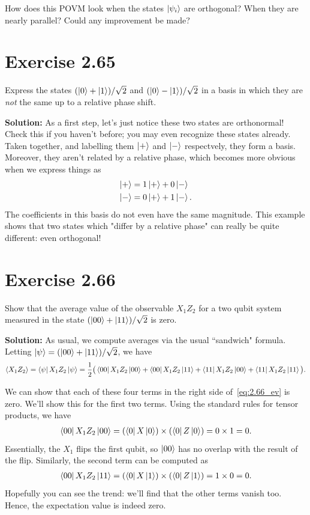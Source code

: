 \documentclass{book}
\begin{document}
    How does this POVM look when the states $\ket{\psi_i}$ are orthogonal? When they are nearly parallel? Could any improvement be made?

\section*{Exercise 2.65}
    Express the states $(\ket{0}+\ket{1})/\sqrt{2}$ and $(\ket{0}-\ket{1})/\sqrt{2}$ in a basis in which they are \emph{not} the same up to a relative phase shift.

    \textbf{Solution:} As a first step, let's just notice these two states are orthonormal! Check this if you haven't before; you may even recognize these states already. Taken together, and labelling them $\ket{+}$ and $\ket{-}$ respectvely, they form a basis. Moreover, they aren't related by a relative phase, which becomes more obvious when we express things as 
    \begin{align}
    \begin{aligned}
        \ket{+} &= 1\ket{+} + 0 \ket{-} \\
        \ket{-} &= 0\ket{+} + 1\ket{-}.
    \end{aligned}
    \end{align}
    The coefficients in this basis do not even have the same magnitude. This example shows that two states which "differ by a relative phase" can really be quite different: even orthogonal!

\section*{Exercise 2.66} 
    Show that the average value of the observable $X_1 Z_2$ for a two qubit system measured in the state $(\ket{00}+\ket{11})/\sqrt{2}$ is zero.

    \textbf{Solution:} As usual, we compute averages via the usual ``sandwich" formula. Letting $\ket{\psi}= (\ket{00}+\ket{11})/\sqrt{2}$, we have
    \begin{align} \label{eq:2.66_ev}
        \langle X_1 Z_2\rangle = \bra{\psi}X_1 Z_2 \ket{\psi} = \frac{1}{2}\big(\bra{00}X_1 Z_2 \ket{00} + \bra{00}X_1 Z_2 \ket{11} + \bra{11}X_1 Z_2 \ket{00} + \bra{11}X_1 Z_2 \ket{11}\big).
    \end{align}

    We can show that each of these four terms in the right side of~\eqref{eq:2.66_ev} is zero. We'll show this for the first two terms. Using the standard rules for tensor products, we have
    \begin{align}
        \bra{00}X_1 Z_2 \ket{00} = (\bra{0}X\ket{0})\times (\bra{0}Z\ket{0}) = 0 \times 1 = 0.
    \end{align}
    Essentially, the $X_1$ flips the first qubit, so $\ket{00}$ has no overlap with the result of the flip. Similarly, the second term can be computed as
    \begin{align}
        \bra{00}X_1 Z_2 \ket{11} = (\bra{0}X\ket{1})\times(\bra{0}Z\ket{1}) = 1 \times 0 = 0.
    \end{align}
    Hopefully you can see the trend: we'll find that the other terms vanish too. Hence, the expectation value is indeed zero.
\end{document}
